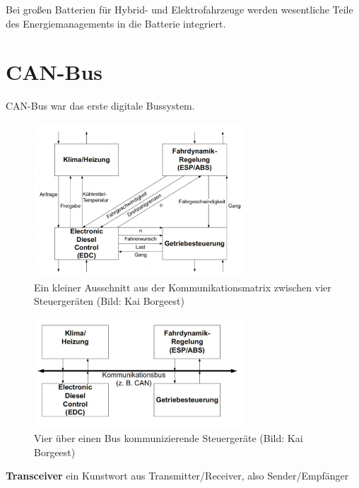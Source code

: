 Bei großen Batterien für Hybrid- und Elektrofahrzeuge werden wesentliche
Teile des Energiemanagements in die Batterie integriert.

\newpage

\section{CAN-Bus}\label{can-bus}

CAN-Bus war das erste digitale Bussystem.

\begin{figure}[!ht]%
\centering
\includegraphics[width=0.7\textwidth]{images/CAN/CAN-3.pdf}
\caption{Ein kleiner Ausschnitt aus der Kommunikationsmatrix zwischen
vier Steuergeräten (Bild: Kai Borgeest)}
\end{figure}

\begin{figure}[!ht]%
\centering
\includegraphics[width=0.7\textwidth]{images/CAN/CAN-4.pdf}
\caption{Vier über einen Bus kommunizierende Steuergeräte (Bild: Kai
Borgeest)}
\end{figure}

\newpage

\textbf{Transceiver} ein Kunstwort aus Transmitter/Receiver, also
Sender/Empfänger

